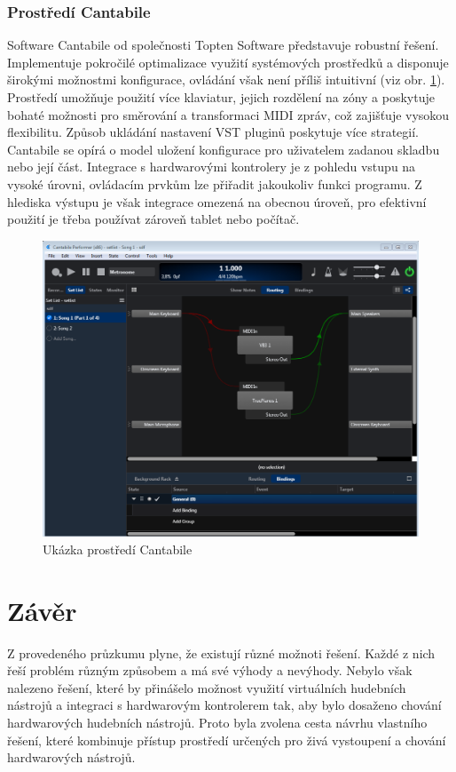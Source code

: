 \documentclass[thesis=M,czech]{FITthesis}[2019/03/06]
\begin{document}
			\subsubsection{Prostředí Cantabile}
				Software Cantabile od společnosti Topten Software představuje robustní řešení.
				Implementuje pokročilé optimalizace využití systémových prostředků a
				disponuje širokými možnostmi konfigurace, ovládání však není příliš intuitivní (viz obr. \ref{fig:Cantabile}).
				Prostředí umožňuje použití více klaviatur, jejich rozdělení na zóny a poskytuje bohaté možnosti
				pro směrování a transformaci MIDI zpráv, což zajišťuje vysokou flexibilitu.
				Způsob ukládání nastavení VST pluginů poskytuje více strategií.
				Cantabile se opírá o model uložení konfigurace pro uživatelem zadanou skladbu nebo její část.
				Integrace s hardwarovými kontrolery je z pohledu vstupu na vysoké úrovni, ovládacím prvkům lze přiřadit jakoukoliv 
				funkci programu. Z hlediska výstupu je však integrace omezená na obecnou úroveň, pro efektivní použití
				je třeba používat zároveň tablet nebo počítač.
				\begin{figure}[H]
					\centering
					\includegraphics[width=1\textwidth]{Cantabile}
					\caption{Ukázka prostředí Cantabile}\label{fig:Cantabile}
				\end{figure}
		
	\section{Závěr}
		Z provedeného průzkumu plyne, že existují různé možnoti řešení. Každé z nich řeší problém různým způsobem a má své výhody a nevýhody.
		Nebylo však nalezeno řešení, které by přinášelo možnost využití virtuálních hudebních nástrojů a integraci s hardwarovým kontrolerem tak,
		aby bylo dosaženo chování hardwarových hudebních nástrojů. Proto byla zvolena cesta návrhu vlastního řešení, které kombinuje přístup
		prostředí určených pro živá vystoupení a chování hardwarových nástrojů.
\end{document}

